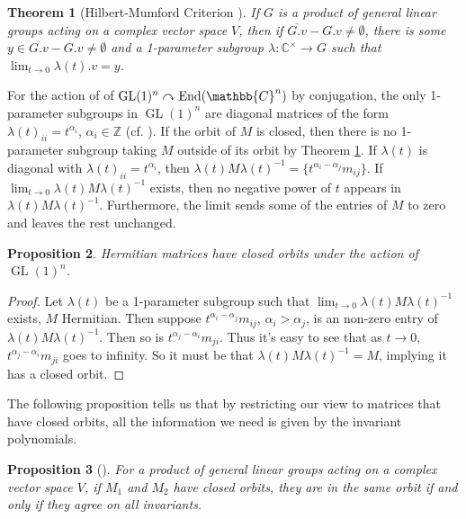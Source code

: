 \documentclass[twocolumn,superscriptaddress]{revtex4-1}
\newcommand{\C}{\mathbb{C}}
\newcommand{\ZZ}{\mathbb{Z}}
\newcommand{\GL}{\operatorname{GL}}
\newcommand{\End}{\textnormal{End}}
\newcommand{\actson}{\curvearrowright}
\theoremstyle{plain}
\newtheorem{theorem}{Theorem}[section]
\newtheorem{proposition}[theorem]{Proposition}
\theoremstyle{definition}
\theoremstyle{definition}
\theoremstyle{definition}
\theoremstyle{definition}
\theoremstyle{definition}
\theoremstyle{definition}
\begin{document}
\begin{theorem}[Hilbert-Mumford Criterion \cite{kempf1978instability}]\label{thm:hmcrit}
 If $G$ is a product of general linear groups acting on a complex vector space $V$, then  if $\overline{G.v}-G.v\ne\emptyset$, there is some $y\in\overline{G.v}-G.v\ne\emptyset$ and a 1-parameter subgroup $\lambda:\C^\times\to G$ such that $\lim_{t\to 0}{\lambda(t).v}=y$.
\end{theorem}

For the action of of $\GL(1)^n\actson\End(\C^n)$ by conjugation, the only 1-parameter subgroups in $\GL(1)^n$ are diagonal matrices of the form $\lambda(t)_{ii}=t^{\alpha_i}$, $\alpha_i\in\ZZ$ (cf. \cite{kraft2000classical}). If the orbit of $M$ is closed, then there is no 1-parameter subgroup taking $M$ outside of its orbit by Theorem \ref{thm:hmcrit}. If $\lambda(t)$ is diagonal with $\lambda(t)_{ii}=t^{\alpha_i}$, then $\lambda(t)M\lambda(t)^{-1}=\{t^{\alpha_i-\alpha_j}m_{ij}\}$. If $\lim_{t\to0}{\lambda(t)M\lambda(t)^{-1}}$ exists, then no negative power of $t$ appears in $\lambda(t)M\lambda(t)^{-1}$. Furthermore, the limit sends some of the entries of $M$ to zero and leaves the rest unchanged.
 
\begin{proposition}\label{cor:lambdaclosed}
 Hermitian matrices have closed orbits under the action of $\GL(1)^n$.
\end{proposition}
\begin{proof}
Let $\lambda(t)$ be a 1-parameter subgroup such that $\lim_{t\to 0}{\lambda(t)M\lambda(t)^{-1}}$ exists, $M$ Hermitian. Then suppose $t^{\alpha_i-\alpha_j}m_{ij}$, $\alpha_i>\alpha_j$, is an non-zero entry of $\lambda(t)M\lambda(t)^{-1}$. Then so is $t^{\alpha_j-\alpha_i}m_{ji}$. Thus it's easy to see that as $t\to 0$, $t^{\alpha_j-\alpha_i}m_{ji}$ goes to infinity. So it must be that $\lambda(t)M\lambda(t)^{-1}=M$, implying it has a closed orbit.
\end{proof}

The following proposition tells us that by restricting our view to matrices that have closed orbits, all the information we need is given by the invariant polynomials.

\begin{proposition}[\cite{MR1304906}]\label{prop:closedorbits}
 For a product of general linear groups acting on a complex vector space $V$, if $M_1$ and $M_2$ have closed orbits, they are in the same orbit if and only if they agree on all invariants.
\end{proposition}
\end{document}
